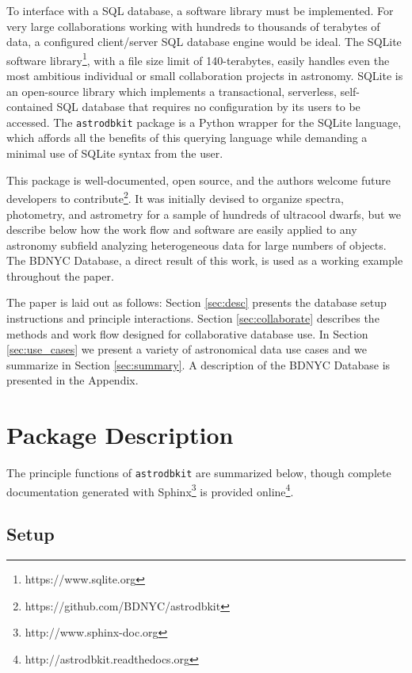 \documentclass[iop,revtex4,natbib209]{emulateapj}
\begin{document}
To interface with a SQL database, a software library must be implemented. For very large collaborations working with hundreds to thousands of terabytes of data, a configured client/server SQL database engine would be ideal. The SQLite software library\footnote{https://www.sqlite.org}, with a file size limit of 140-terabytes, easily handles even the most ambitious individual or small collaboration projects in astronomy. SQLite is an open-source library which implements a transactional, serverless, self-contained SQL database that requires no configuration by its users to be accessed. The \texttt{astrodbkit} package is a Python wrapper for the SQLite language, which affords all the benefits of this querying language while demanding a minimal use of  SQLite syntax from the user.

This package is well-documented, open source, and the authors welcome future developers to contribute\footnote{https://github.com/BDNYC/astrodbkit}. It was initially devised to organize spectra, photometry, and astrometry for a sample of hundreds of ultracool dwarfs, but we describe below how the work flow and software are easily applied to any astronomy subfield analyzing heterogeneous data for large numbers of objects. The BDNYC Database, a direct result of this work, is used as a working example throughout the paper.


The paper is laid out as follows: Section \ref{sec:desc} presents the database setup instructions and principle interactions. Section \ref{sec:collaborate} describes the methods and work flow designed for collaborative database use. In Section \ref{sec:use_cases} we present a variety of astronomical data use cases and we summarize in Section \ref{sec:summary}. A description of the BDNYC Database is presented in the Appendix. 

\section{Package Description}{\label{sec:desc}}
The principle functions of \texttt{astrodbkit} are summarized below, though complete documentation generated with Sphinx\footnote{http://www.sphinx-doc.org} is provided online\footnote{http://astrodbkit.readthedocs.org}.

\subsection{Setup}{\label{sec:setup}}
\end{document}
